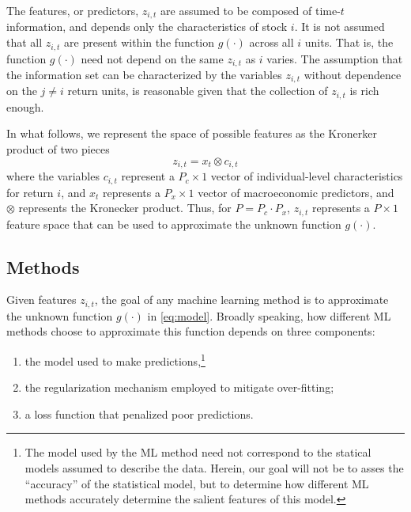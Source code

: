 \documentclass{article}
\begin{document}
The features, or predictors, $z_{i,t}$ are assumed to be composed of time-$t$ information, and depends only the characteristics of stock $i$. It is not assumed that all $z_{i,t}$ are present within the function $g(\cdot)$ across all $i$ units. That is, the function $g(\cdot)$ need not depend on the same $z_{i,t}$ as $i$ varies. The assumption that the information set can be characterized by the variables $z_{i,t}$ without dependence on the $j\neq i$ return units, is reasonable given that the collection of $z_{i,t}$ is rich enough. 

In what follows, we represent  the space of possible features as the Kronerker product of two pieces
\begin{equation}
\label{kronecker_equation}
z_{i,t} = x_t \otimes c_{i,t}
\end{equation}where the variables \( c_{i,t} \) represent a \( P_c \times 1 \) vector of individual-level characteristics for return \(i\), and \(x_t\) represents a $P_x \times 1$ vector of macroeconomic predictors, and $\otimes$ represents the Kronecker product. Thus, for $P = P_c\cdot P_x$, $z_{i,t}$ represents a $P \times 1$ feature space that can be used to approximate the unknown function $g(\cdot)$.
	
	


\subsection{Methods}Given features $z_{i,t}$, the goal of any machine learning method is to approximate the unknown function $g(\cdot)$ in \ref{eq:model}.  Broadly speaking, how different ML methods choose to approximate this function depends on three components:
\begin{enumerate}
	\item the model used to make predictions,\footnote{The model used by the ML method need not correspond to the statical models assumed to describe the data. Herein, our goal will not be to asses the ``accuracy'' of the statistical model, but to determine how different ML methods accurately determine the salient features of this model. }
	\item the regularization mechanism employed to mitigate over-fitting; 
	\item a loss function that penalized poor predictions. 
\end{enumerate}

\end{document}
